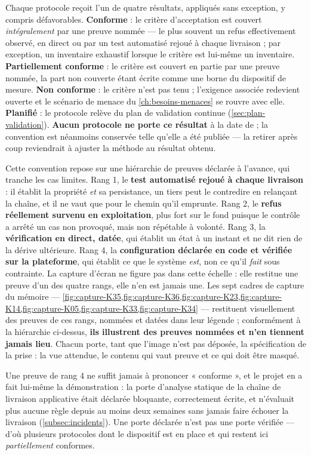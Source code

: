 Chaque protocole reçoit l'un de quatre résultats, appliqués sans exception, y compris
défavorables. \textbf{Conforme} : le critère d'acceptation est couvert \emph{intégralement} par
une preuve nommée --- le plus souvent un refus effectivement observé, en direct ou par un test
automatisé rejoué à chaque livraison ; par exception, un inventaire exhaustif lorsque le critère
est lui-même un inventaire. \textbf{Partiellement conforme} : le critère est couvert en partie par
une preuve nommée, la part non couverte étant écrite comme une borne du dispositif de mesure.
\textbf{Non conforme} : le critère n'est pas tenu ; l'exigence associée redevient ouverte et le
scénario de menace du \cref{ch:besoins-menaces} se rouvre avec elle. \textbf{Planifié} : le protocole relève du
plan de validation continue (\cref{sec:plan-validation}). \textbf{Aucun protocole ne porte ce
résultat} à la date de \dateref{} ; la convention est néanmoins conservée telle qu'elle a été
publiée --- la retirer après coup reviendrait à ajuster la méthode au résultat obtenu.

Cette convention repose sur une hiérarchie de preuves déclarée à l'avance, qui tranche les cas
limites. Rang 1, le \textbf{test automatisé rejoué à chaque livraison} : il établit la propriété
\emph{et} sa persistance, un tiers peut le contredire en relançant la chaîne, et il ne vaut que
pour le chemin qu'il emprunte. Rang 2, le \textbf{refus réellement survenu en exploitation}, plus
fort sur le fond puisque le contrôle a arrêté un cas non provoqué, mais non répétable à volonté.
Rang 3, la \textbf{vérification en direct, datée}, qui établit un état à un instant et ne dit rien
de la dérive ultérieure. Rang 4, la \textbf{configuration déclarée en code et vérifiée sur la
plateforme}, qui établit ce que le système \emph{est}, non ce qu'il \emph{fait} sous contrainte. La
capture d'écran ne figure pas dans cette échelle : elle restitue une preuve d'un des quatre rangs,
elle n'en est jamais une. Les sept cadres de capture du mémoire ---
\cref{fig:capture-K35,fig:capture-K36,fig:capture-K23,fig:capture-K14,fig:capture-K05,fig:capture-K33,fig:capture-K34}
--- restituent visuellement des preuves de ces rangs, nommées et datées dans leur légende ;
conformément à la hiérarchie ci-dessus, \textbf{ils illustrent des preuves nommées et n'en
tiennent jamais lieu}. Chacun porte, tant que l'image n'est pas déposée, la spécification de la
prise : la vue attendue, le contenu qui vaut preuve et ce qui doit être masqué.

\begin{alertbox}
Une preuve de rang 4 ne suffit jamais à prononcer « conforme », et le projet en a fait lui-même
la démonstration : la porte d'analyse statique de la chaîne de livraison applicative était
déclarée bloquante, correctement écrite, et n'évaluait plus aucune règle depuis au moins deux
semaines sans jamais faire échouer la livraison (\cref{subsec:incidents}). Une porte déclarée n'est pas une porte
vérifiée --- d'où plusieurs protocoles dont le dispositif est en place et qui restent ici
\emph{partiellement} conformes.
\end{alertbox}


